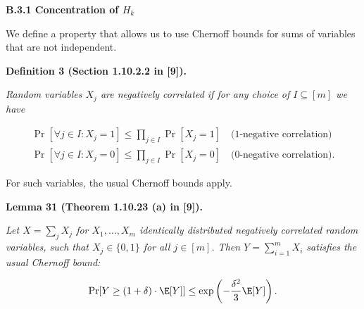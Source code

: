 \documentclass[10pt,a4paper]{article}
\begin{document}
\par\medskip\noindent\textbf{B.3.1 Concentration of $H_{k}$}\par




We define a property that allows us to use Chernoff bounds for sums of variables that are not independent.\par





\par\medskip\noindent\textbf{\textbf{Definition 3}\textbf{ }(Section 1.10.2.2 in [9])\textbf{.}}\par



\emph{Random variables $X_{j}$ are negatively correlated if for any choice of $I\subseteq[m]$ we have}\par


\[\begin{gathered}
\displaystyle\Pr[\forall j\in I:X_{j}=1] \displaystyle\leq\prod_{j\in I}{\Pr[X_{j}=1]}\quad\text{(1-negative correlation)} \\
\displaystyle\Pr[\forall j\in I:X_{j}=0] \displaystyle\leq\prod_{j\in I}{\Pr[X_{j}=0]}\quad\text{(0-negative correlation)}.
\end{gathered}\]






For such variables, the usual Chernoff bounds apply.\par





\par\medskip\noindent\textbf{\textbf{Lemma 31}\textbf{ }(Theorem 1.10.23 (a) in [9])\textbf{.}}\par



\emph{Let $X=\sum_{j}{X_{j}}$ for $X_{1},\dots,X_{m}$ identically distributed negatively correlated random variables, such that $X_{j}\in\{0,1\}$ for all $j\in[m]$.
Then $Y=\sum_{i=1}^{m}X_{i}$ satisfies the usual Chernoff bound:}\par


\[\begin{gathered}
\displaystyle\Pr[Y\geq(1+\delta)\cdot\E[Y]]\leq\exp\left(-\frac{\delta^{2}}{3}\E[Y]\right).
\end{gathered}\]
\end{document}
